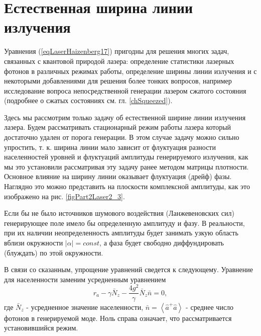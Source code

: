 \section{Естественная ширина линии излучения}
Уравнения (\ref{eqLaserHaizenberg17}) пригодны для решения многих
задач, связанных с квантовой природой лазера: определение статистики
лазерных фотонов в различных режимах работы, определение ширины
линии излучения и с некоторыми добавлениями для решения более тонких
вопросов, например исследование вопроса непосредственной генерации
лазером сжатого состояния (подробнее о сжатых состояниях
см. гл. \ref{chSqueezed}). 



Здесь мы рассмотрим только задачу об естественной ширине линии
излучения лазера. Будем рассматривать стационарный режим работы лазера
который достаточно удален от порога генерации. В этом случае задачу
можно сильно упростить, т. к. ширина линии мало зависит от флуктуация
разности населенностей уровней и флуктуаций амплитуды генерируемого
излучения, как мы это установили рассматривая эту задачу ранее методом
матрицы плотности. Основное влияние на ширину линии оказывает
флуктуация (дрейф) фазы. Наглядно это можно представить на плоскости
комплексной амплитуды, как это изображено на
рис. \ref{figPart2Laser2_3}.

Если бы не было источников шумового воздействия (Ланжевеновских сил)
генерирующее поле имело бы определенную амплитуду и фазу. В
реальности, при их наличии неопределенность амплитуды будет занимать
узкую область вблизи окружности $\left|\alpha\right| = const$, а фаза
будет свободно диффундировать (блуждать) по этой окружности. 

В связи со сказанным, упрощение уравнений сведется к
следующему. Уравнение для населенности заменим усредненным уравнением 
\begin{equation}
r_a - \gamma \bar{N}_z - \frac{4 g^2}{\gamma}\bar{N}_z\bar{n} = 0,
\label{eqLaserHaizenberg19}
\end{equation}
где $\bar{N}_z$ - усредненное значение населенности, $\bar{n} =
\left<\hat{a}^{+}\hat{a}\right>$ - среднее число фотонов в
генерируемой моде. Ноль справа означает, что рассматривается
установившийся режим. 

